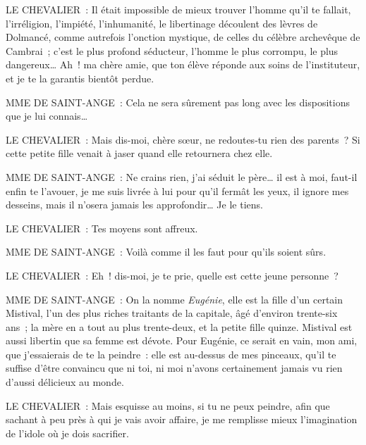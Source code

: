 \documentclass[french,twoside]{book} %
\begin{document}
LE CHEVALIER : Il était impossible de mieux trouver l’homme qu’il te fallait, l’irréligion, l’impiété, l’inhumanité, le libertinage découlent des lèvres de Dolmancé, comme autrefois l’onction mystique, de celles du célèbre archevêque de Cambrai ; c’est le plus profond séducteur, l’homme le plus corrompu, le plus dangereux… Ah ! ma chère amie, que ton élève réponde aux soins de l’instituteur, et je te la garantis bientôt perdue.\par
MME DE SAINT-ANGE : Cela ne sera sûrement pas long avec les dispositions que je lui connais…\par
LE CHEVALIER : Mais dis-moi, chère sœur, ne redoutes-tu rien des parents ? Si cette petite fille venait à jaser quand elle retournera chez elle.\par
MME DE SAINT-ANGE : Ne crains rien, j’ai séduit le père… il est à moi, faut-il enfin te l’avouer, je me suis livrée à lui pour qu’il fermât les yeux, il ignore mes desseins, mais il n’osera jamais les approfondir… Je le tiens.\par
LE CHEVALIER : Tes moyens sont affreux.\par
MME DE SAINT-ANGE : Voilà comme il les faut pour qu’ils soient sûrs.\par
LE CHEVALIER : Eh ! dis-moi, je te prie, quelle est cette jeune personne ?\par
MME DE SAINT-ANGE : On la nomme {\itshape Eugénie}, elle est la fille d’un certain Mistival, l’un des plus riches traitants de la capitale, âgé d’environ trente-six ans ; la mère en a tout au plus trente-deux, et la petite fille quinze. Mistival est aussi libertin que sa femme est dévote. Pour Eugénie, ce serait en vain, mon ami, que j’essaierais de te la peindre : elle est au-dessus de mes pinceaux, qu’il te suffise d’être convaincu que ni toi, ni moi n’avons certainement jamais vu rien d’aussi délicieux au monde.\par
LE CHEVALIER : Mais esquisse au moins, si tu ne peux peindre, afin que sachant à peu près à qui je vais avoir affaire, je me remplisse mieux l’imagination de l’idole où je dois sacrifier.\par
\end{document}
